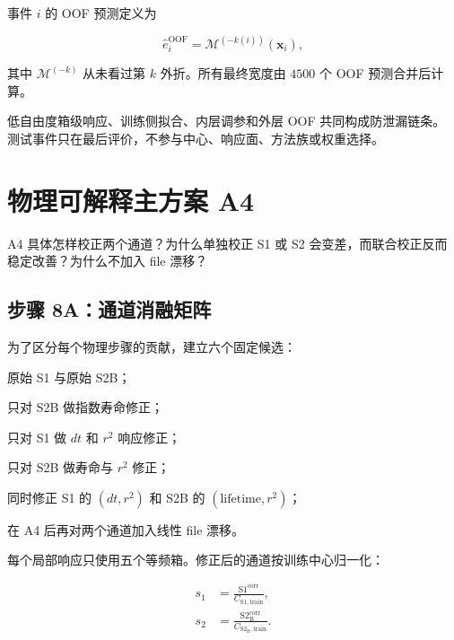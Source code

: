 \documentclass[UTF8,12pt,a4paper,oneside,fontset=none]{ctexart}
\numberwithin{equation}{section}
\newcommand{\Sone}{\mathrm{S1}}
\newcommand{\StwoB}{\mathrm{S2}_{\mathrm{B}}}
\newcommand{\OOF}{\mathrm{OOF}}
\newcommand{\Erel}{\hat e}
\begin{document}
事件 \(i\) 的 OOF 预测定义为

\begin{equation}
\Erel_i^{\OOF}
=
\mathcal M^{(-k(i))}(\symbf{x}_i),
\label{eq:oof}
\end{equation}

其中 \(\mathcal M^{(-k)}\) 从未看过第 \(k\) 外折。所有最终宽度由 \(4500\) 个 OOF 预测合并后计算。

\begin{conclusionbox}
低自由度箱级响应、训练侧拟合、内层调参和外层 OOF 共同构成防泄漏链条。
测试事件只在最后评价，不参与中心、响应面、方法族或权重选择。
\end{conclusionbox}

\section{物理可解释主方案 A4}

\begin{questionbox}
A4 具体怎样校正两个通道？为什么单独校正 S1 或 S2 会变差，而联合校正反而稳定改善？为什么不加入 file 漂移？
\end{questionbox}

\subsection{步骤 8A：通道消融矩阵}

为了区分每个物理步骤的贡献，建立六个固定候选：

\begin{description}[leftmargin=1.5cm,labelwidth=1.1cm]
  \item[A0] 原始 S1 与原始 S2B；
  \item[A1] 只对 S2B 做指数寿命修正；
  \item[A2] 只对 S1 做 \(dt\) 和 \(r^2\) 响应修正；
  \item[A3] 只对 S2B 做寿命与 \(r^2\) 修正；
  \item[A4] 同时修正 S1 的 \((dt,r^2)\) 和 S2B 的 \((\text{lifetime},r^2)\)；
  \item[A5] 在 A4 后再对两个通道加入线性 file 漂移。
\end{description}

每个局部响应只使用五个等频箱。修正后的通道按训练中心归一化：

\begin{align}
s_1
&=
\frac{\Sone^{\mathrm{corr}}}{C_{\Sone,\mathrm{train}}},
\label{eq:s1-normalized}\\
s_2
&=
\frac{\StwoB^{\mathrm{corr}}}{C_{\StwoB,\mathrm{train}}}.
\label{eq:s2-normalized}
\end{align}
\end{document}
